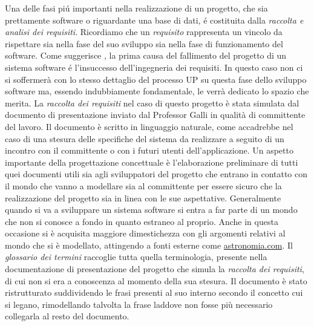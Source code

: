 \documentclass[12pt,a4paper,onecolumn,x11names]{article}
\begin{document}
	\begin{flushleft}
		Una delle fasi pi\'{u} importanti nella realizzazione di un progetto, che sia prettamente software o riguardante una base di dati, \'{e} costituita dalla \textit{raccolta e analisi dei requisiti}. Ricordiamo che un \textit{requisito} rappresenta un vincolo da rispettare sia nella fase del suo sviluppo sia nella fase di funzionamento del software. Come suggerisce \cite{Arlow}, la prima causa del fallimento del progetto di un sistema software \'{e} l'insuccesso dell'ingegneria dei requisiti. In questo caso non ci si soffermerà con lo stesso dettaglio del processo UP su questa fase dello sviluppo software ma, essendo indubbiamente fondamentale, le verrà dedicato lo spazio che merita.
		\newline\newline
		La \textit{raccolta dei requisiti} nel caso di questo progetto è stata simulata dal documento di presentazione inviato dal Professor Galli in qualità di committente del lavoro. Il documento è scritto in linguaggio naturale, come accadrebbe nel caso di una stesura delle  specifiche del sistema da realizzare a seguito di un incontro con il committente o con i futuri utenti dell'applicazione.
		Un aspetto importante della progettazione concettuale è l'elaborazione preliminare di tutti quei documenti utili sia agli sviluppatori del progetto che entrano in contatto con il mondo che vanno a modellare sia al committente per essere sicuro che la realizzazione del progetto sia in linea con le sue aspettative. 
		\newline\newline
		Generalmente quando si va a sviluppare un sistema software si entra a far parte di un mondo che non si conosce a fondo in quanto estraneo al proprio. Anche in questa occasione si è acquisita maggiore dimestichezza con gli argomenti relativi al mondo che si è modellato, attingendo a fonti esterne come \textsf{\href{http://www.astronomia.com}{astronomia.com}}. Il \textit{glossario dei termini} raccoglie tutta quella terminologia, presente nella documentazione di presentazione del progetto che simula la \textit{raccolta dei requisiti}, di cui non si era a conoscenza al momento della sua stesura.\newline\newline		
		Il documento è stato ristrutturato suddividendo le frasi presenti al suo interno secondo il concetto cui si legano, rimodellando talvolta la frase laddove non fosse più necessario collegarla al resto del documento.
	\end{flushleft}
	
\end{document}
